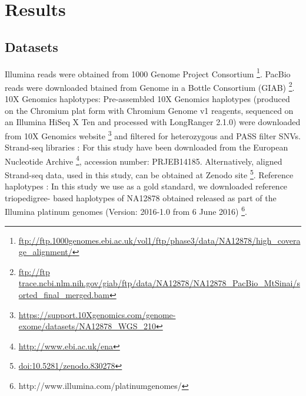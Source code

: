 \section{Results}
\subsection{Datasets} 
Illumina reads \citep{sudmant2015integrated, 10002015global} were obtained from 1000 Genome Project Consortium \footnote{\url{ftp://ftp.1000genomes.ebi.ac.uk/vol1/ftp/phase3/data/NA12878/high_coverage_alignment/}}. 
PacBio reads \citep{giab} were downloaded btained from Genome in a Bottle Consortium (GIAB) \footnote{\url{ftp://ftp trace.ncbi.nlm.nih.gov/giab/ftp/data/NA12878/NA12878_PacBio_MtSinai/sorted_final_merged.bam}}. 
10X Genomics haplotypes: Pre-assembled 10X Genomics haplotypes (produced on the Chromium plat form with Chromium Genome v1 reagents, sequenced on an Illumina HiSeq X Ten and processed with LongRanger 2.1.0) were downloaded from 
10X Genomics website \footnote{\url{https://support.10Xgenomics.com/genome-exome/datasets/NA12878_WGS_210}} and filtered for heterozygous and PASS filter SNVs. 
Strand-seq libraries \citep{porubsky2016direct}: For this study have been downloaded from the European Nucleotide Archive \footnote{\url{http://www.ebi.ac.uk/ena}}, accession number: PRJEB14185. 
Alternatively, aligned Strand-seq data, used in this study, can be obtained at Zenodo site \footnote{\url{doi:10.5281/zenodo.830278}}. 
Reference haplotypes \citep{eberle2017reference}: In this study we use as a gold standard, we downloaded reference triopedigree- based haplotypes of NA12878 obtained released as part of the Illumina platinum genomes (Version: 2016-1.0 from 6 June 2016) \footnote{http://www.illumina.com/platinumgenomes/}.

